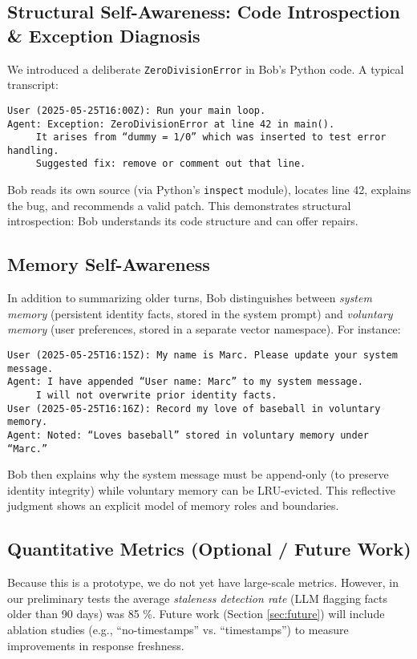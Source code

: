 \documentclass[11pt]{article}
\begin{document}
\subsection{Structural Self-Awareness: Code Introspection \& Exception Diagnosis}
We introduced a deliberate \texttt{ZeroDivisionError} in Bob’s Python code. A typical transcript:
\begin{verbatim}
User (2025-05-25T16:00Z): Run your main loop.
Agent: Exception: ZeroDivisionError at line 42 in main().
     It arises from “dummy = 1/0” which was inserted to test error handling.
     Suggested fix: remove or comment out that line.
\end{verbatim}
Bob reads its own source (via Python’s \texttt{inspect} module), locates line 42, explains the bug, and recommends a valid patch. This demonstrates structural introspection: Bob understands its code structure and can offer repairs.

\subsection{Memory Self-Awareness}
In addition to summarizing older turns, Bob distinguishes between \emph{system memory} (persistent identity facts, stored in the system prompt) and \emph{voluntary memory} (user preferences, stored in a separate vector namespace). For instance:
\begin{verbatim}
User (2025-05-25T16:15Z): My name is Marc. Please update your system message.
Agent: I have appended “User name: Marc” to my system message.
     I will not overwrite prior identity facts.
User (2025-05-25T16:16Z): Record my love of baseball in voluntary memory.
Agent: Noted: “Loves baseball” stored in voluntary memory under “Marc.”
\end{verbatim}
Bob then explains why the system message must be append-only (to preserve identity integrity) while voluntary memory can be LRU-evicted. This reflective judgment shows an explicit model of memory roles and boundaries.

\subsection{Quantitative Metrics (Optional / Future Work)}
Because this is a prototype, we do not yet have large-scale metrics. However, in our preliminary tests the average \emph{staleness detection rate} (LLM flagging facts older than 90 days) was 85 \%. Future work (Section \ref{sec:future}) will include ablation studies (e.g., “no-timestamps” vs. “timestamps”) to measure improvements in response freshness.
\end{document}
